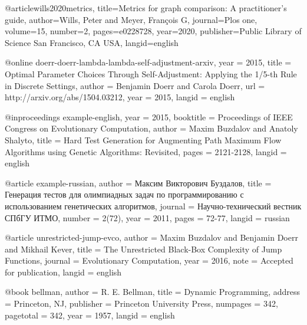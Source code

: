  @article{wills2020metrics,
  title={Metrics for graph comparison: A practitioner’s guide},
  author={Wills, Peter and Meyer, Fran{\c{c}}ois G},
  journal={Plos one},
  volume={15},
  number={2},
  pages={e0228728},
  year={2020},
  publisher={Public Library of Science San Francisco, CA USA},
  langid={english}
 }

 @online{ doerr-doerr-lambda-lambda-self-adjustment-arxiv,
  year        = {2015},
  title       = {Optimal Parameter Choices Through Self-Adjustment: Applying the 1/5-th Rule in
   Discrete Settings},
  author      = {Benjamin Doerr and Carola Doerr},
  url         = {http://arxiv.org/abs/1504.03212},
  year        = {2015},
  langid      = {english}
 }

 @inproceedings{ example-english,
  year        = {2015},
  booktitle   = {Proceedings of IEEE Congress on Evolutionary Computation},
  author      = {Maxim Buzdalov and Anatoly Shalyto},
  title       = {Hard Test Generation for Augmenting Path Maximum Flow
   Algorithms using Genetic Algorithms: Revisited},
  pages       = {2121-2128},
  langid      = {english}
 }

 @article{ example-russian,
  author      = {Максим Викторович Буздалов},
  title       = {Генерация тестов для олимпиадных задач по программированию
   с использованием генетических алгоритмов},
  journal     = {Научно-технический вестник {СПбГУ} {ИТМО}},
  number      = {2(72)},
  year        = {2011},
  pages       = {72-77},
  langid      = {russian}
 }

 @article{ unrestricted-jump-evco,
  author      = {Maxim Buzdalov and Benjamin Doerr and Mikhail Kever},
  title       = {The Unrestricted Black-Box Complexity of Jump Functions},
  journal     = {Evolutionary Computation},
  year        = {2016},
  note        = {Accepted for publication},
  langid      = {english}
 }

 @book{ bellman,
  author      = {R. E. Bellman},
  title       = {Dynamic Programming},
  address     = {Princeton, NJ},
  publisher   = {Princeton University Press},
  numpages    = {342},
  pagetotal   = {342},
  year        = {1957},
  langid      = {english}
 }
